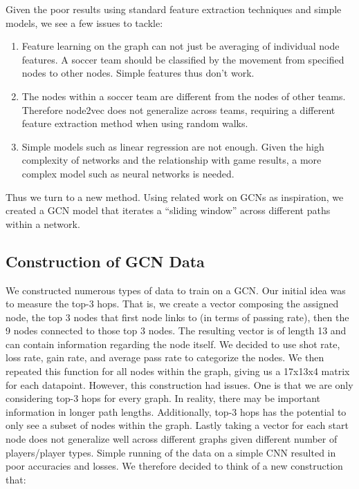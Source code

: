 Given the poor results using standard feature extraction techniques and simple models, we see a few issues to tackle:

\begin{enumerate}

    \item Feature learning on the graph can not just be averaging of individual node features. A soccer team should be classified by the movement from specified nodes to other nodes. Simple features thus don’t work. 


    \item The nodes within a soccer team are different from the nodes of other teams. Therefore node2vec does not generalize across teams, requiring a different feature extraction method when using random walks. 


    \item Simple models such as linear regression are not enough. Given the high complexity of networks and the relationship with game results, a more complex model such as neural networks is needed. 

\end{enumerate}

Thus we turn to a new method. Using related work on GCNs as inspiration, we created a GCN model that iterates a “sliding window” across different paths within a network. 

\subsection{Construction of GCN Data}

We constructed numerous types of data to train on a GCN. Our initial idea was to measure the top-3 hops. That is, we create a vector composing the assigned node, the top 3 nodes that first node links to (in terms of passing rate), then the 9 nodes connected to those top 3 nodes. The resulting vector is of length 13 and can contain information regarding the node itself. We decided to use shot rate, loss rate, gain rate, and average pass rate to categorize the nodes. We then repeated this function for all nodes within the graph, giving us a 17x13x4 matrix for each datapoint. However, this construction had issues. One is that we are only considering top-3 hops for every graph. In reality, there may be important information in longer path lengths. Additionally, top-3 hops has the potential to only see a subset of nodes within the graph. Lastly taking a vector for each start node does not generalize well across different graphs given different number of players/player types. Simple running of the data on a simple CNN resulted in poor accuracies and losses. We therefore decided to think of a new construction that: 

